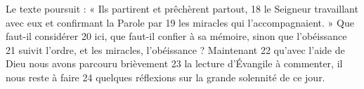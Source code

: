 Le texte poursuit : « Ils partirent et prêchèrent partout,	 
18	 	le Seigneur travaillant avec eux et confirmant la Parole par	 
19	 	les miracles qui l'accompagnaient. » Que faut-il considérer	 
20	 	ici, que faut-il confier à sa mémoire, sinon que l'obéissance	 
21	 	suivit l'ordre, et les miracles, l'obéissance ? Maintenant	 
22	 	qu'avec l'aide de Dieu nous avons parcouru brièvement	 
23	 	la lecture d'Évangile à commenter, il nous reste à faire	 
24	 	quelques réflexions sur la grande solennité de ce jour.